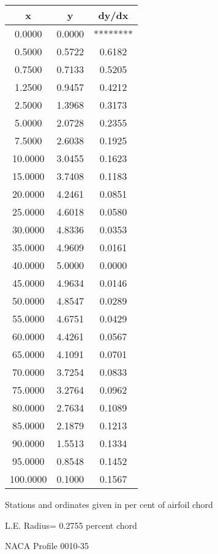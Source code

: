 \documentclass[11pt]{book}
\begin{document}
 \vspace{8mm}
 \begin{tabular}{|c|c|c|} \hline 
  x  &  y  &  dy/dx \\
 \hline
0.0000 & 0.0000 & ******** \\
0.5000 & 0.5722 & 0.6182 \\
0.7500 & 0.7133 & 0.5205 \\
1.2500 & 0.9457 & 0.4212 \\
2.5000 & 1.3968 & 0.3173 \\
5.0000 & 2.0728 & 0.2355 \\
7.5000 & 2.6038 & 0.1925 \\
10.0000 & 3.0455 & 0.1623 \\
15.0000 & 3.7408 & 0.1183 \\
20.0000 & 4.2461 & 0.0851 \\
25.0000 & 4.6018 & 0.0580 \\
30.0000 & 4.8336 & 0.0353 \\
35.0000 & 4.9609 & 0.0161 \\
40.0000 & 5.0000 & 0.0000 \\
45.0000 & 4.9634 & 0.0146 \\
50.0000 & 4.8547 & 0.0289 \\
55.0000 & 4.6751 & 0.0429 \\
60.0000 & 4.4261 & 0.0567 \\
65.0000 & 4.1091 & 0.0701 \\
70.0000 & 3.7254 & 0.0833 \\
75.0000 & 3.2764 & 0.0962 \\
80.0000 & 2.7634 & 0.1089 \\
85.0000 & 2.1879 & 0.1213 \\
90.0000 & 1.5513 & 0.1334 \\
95.0000 & 0.8548 & 0.1452 \\
100.0000 & 0.1000 & 0.1567 \\
 \hline
 \end{tabular}
 \vspace{8mm}


Stations and ordinates given in per cent of airfoil chord 


L.E. Radius=  0.2755 percent chord
 \newpage
  \label{p0010-35}
 \begin{Large}
 NACA Profile 0010-35
 \end{Large}
  
\end{document}
